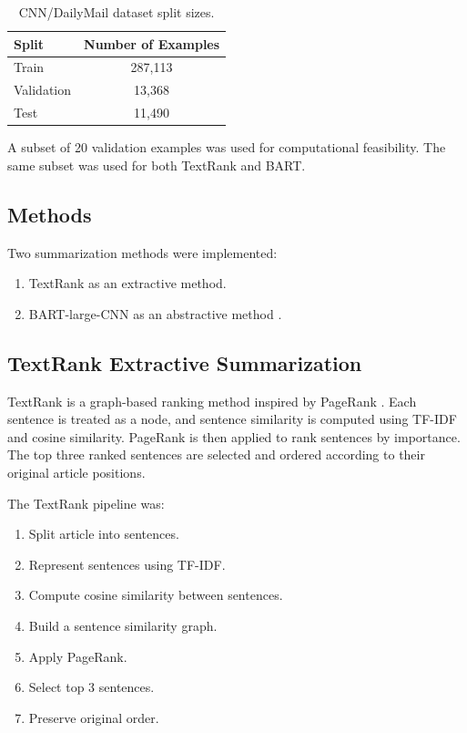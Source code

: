 \documentclass[11pt,a4paper]{article}
\begin{document}
\begin{table}[H]
\centering
\caption{CNN/DailyMail dataset split sizes.}
\begin{tabular}{lc}
\toprule
Split & Number of Examples \\
\midrule
Train & 287,113 \\
Validation & 13,368 \\
Test & 11,490 \\
\bottomrule
\end{tabular}
\end{table}

A subset of 20 validation examples was used for computational feasibility. The same subset was used for both TextRank and BART.

\subsection{Methods}

Two summarization methods were implemented:

\begin{enumerate}[leftmargin=*]
    \item TextRank as an extractive method.
    \item BART-large-CNN as an abstractive method \cite{lewis2020bart}.
\end{enumerate}

\subsection{TextRank Extractive Summarization}

TextRank is a graph-based ranking method inspired by PageRank \cite{mihalcea2004textrank}. Each sentence is treated as a node, and sentence similarity is computed using TF-IDF and cosine similarity. PageRank is then applied to rank sentences by importance. The top three ranked sentences are selected and ordered according to their original article positions.

The TextRank pipeline was:

\begin{enumerate}[leftmargin=*]
    \item Split article into sentences.
    \item Represent sentences using TF-IDF.
    \item Compute cosine similarity between sentences.
    \item Build a sentence similarity graph.
    \item Apply PageRank.
    \item Select top 3 sentences.
    \item Preserve original order.
\end{enumerate}
\end{document}
